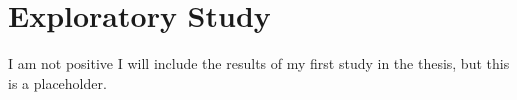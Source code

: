 \chapter{Exploratory Study}
I am not positive I will include the results of my first study in the thesis, but this is a placeholder.








